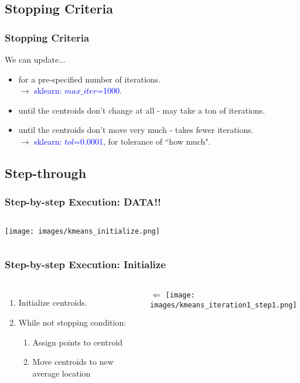 \documentclass{beamer}
\begin{document}
\subsection{Stopping Criteria}
\begin{frame}
  \frametitle{Stopping Criteria}
  We can update... \vspace{4mm}
  \begin{itemize}[<+->]
    \item for a pre-specified number of iterations. \\
      \qquad $\rightarrow$ \textcolor{blue}{sklearn: $max\_iter$=1000}.
    \item until the centroids don’t change at all - may take a ton of iterations.
    \item until the centroids don’t move very much - takes fewer iterations. \\
      \qquad $\rightarrow$ \textcolor{blue}{sklearn: $tol$=0.0001}, for tolerance of ``how much".
  \end{itemize}
\end{frame}

\subsection{Step-through}
\begin{frame}
  \frametitle{Step-by-step Execution: DATA!!}
  \begin{columns}
    \texttt{[image: images/kmeans\_initialize.png]}
  \end{columns}
\end{frame}

\begin{frame}
  \frametitle{Step-by-step Execution: Initialize}
  \begin{columns}
      \begin{enumerate}
        \item Initialize centroids. \vspace{2mm}
        \item While not stopping condition: \vspace{2mm}
        \begin{enumerate}
          \item Assign points to centroid \vspace{2mm}
          \item Move centroids to new average location
        \end{enumerate}
      \end{enumerate}
      $\Longleftarrow$ \vspace{38mm}
      \texttt{[image: images/kmeans\_iteration1\_step1.png]}
  \end{columns}
\end{frame}
\end{document}
